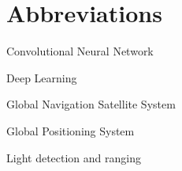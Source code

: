 \chapter*{Abbreviations}

\begin{description}
\setlength{\itemsep}{-11pt}
\setlength{\leftmargin}{900pt}

\item[CNN] Convolutional Neural Network

\item[DL] Deep Learning

\item[GNNS] Global Navigation Satellite System
\item[GPS] Global Positioning System

\item[LIDAR] Light detection and ranging

\end{description}
